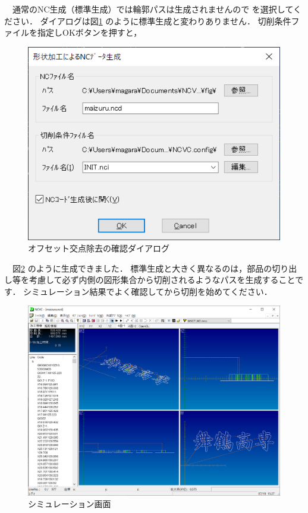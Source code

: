 

\vspace*{1.5zh}
　通常のNC生成（標準生成）では輪郭パスは生成されませんので  を選択してください．
ダイアログは図\ref{fig:make} のように標準生成と変わりありません．
切削条件ファイルを指定しOKボタンを押すと，

\begin{figure}[H]
\centering
\includegraphics[scale=0.7]{No5/fig/dialog.png}
\caption{オフセット交点除去の確認ダイアログ}
\label{fig:make}
\end{figure}

　図\ref{fig:simu} のように生成できました．
標準生成と大きく異なるのは，部品の切り出し等を考慮して必ず内側の図形集合から切削されるようなパスを生成することです．
シミュレーション結果でよく確認してから切削を始めてください．

\begin{figure}[H]
\centering
\includegraphics[scale=0.5]{No5/fig/maizuru.png}
\caption{シミュレーション画面}
\label{fig:simu}
\end{figure}
